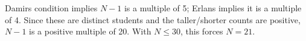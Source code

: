 Damir\textquotesingle s condition implies $N-1$ is a multiple of 5; Erlan\textquotesingle s implies it is a multiple of 4. Since these are distinct students and the taller/shorter counts are positive, $N-1$ is a positive multiple of 20. With $N\le30$, this forces $\boxed{N=21}$.
